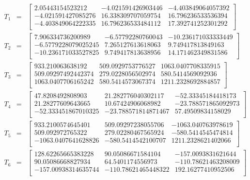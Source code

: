 \begin{eqnarray*}
T_1&=&
\begin{bmatrix}
2.05443154523212 & -4.021591426903446 & -4.403849064057392\\
-4.021591427085276 & 16.338309707059754 & 16.796236533536394\\
-4.403849064222335 & 16.796236533484112 & 17.392741252301292\\
\end{bmatrix}\\
T_2&=&
\begin{bmatrix}
7.906334736200989 & -6.57792280760043 & -10.236171033333449\\
-6.5779228079025245 & 7.265127613618063 & 9.749417813849163\\
-10.236171033527825 & 9.749417813638956 & 14.171462349831586\\
\end{bmatrix}\\
T_3&=&
\begin{bmatrix}
933.210063638192 & 509.0929753776527 & 1063.0407708335915\\
509.09297492442374 & 279.0228056502974 & 580.5414569092936\\
1063.0407706165242 & 580.5414573067374 & 1211.2328692884857\\
\end{bmatrix}\\
T_4&=&
\begin{bmatrix}
47.8208492808903 & 21.282776040302117 & -52.33345184418173\\
21.28277609643665 & 10.67424906068982 & -23.788571865092973\\
-52.333451867010325 & -23.788571814871467 & 57.49509834158029\\
\end{bmatrix}\\
T_5&=&
\begin{bmatrix}
933.2100574645401 & 509.09297238055706 & -1063.040763978619\\
509.092972765322 & 279.02280467565924 & -580.5414545474814\\
-1063.0407641628826 & -580.5414542100707 & 1211.2328621402066\\
\end{bmatrix}\\
T_6&=&
\begin{bmatrix}
128.62265665383228 & 90.05086671584104 & -157.0093831621644\\
90.05086668827934 & 64.5401174556973 & -110.78621463208009\\
-157.00938314635744 & -110.78621465448322 & 192.16277410952506\\
\end{bmatrix}\\
\end{eqnarray*}